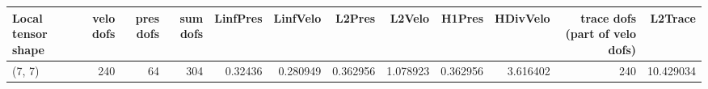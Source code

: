 \begin{tabular}{lrrrrrrrrrrr}
\toprule
Local tensor shape &  velo dofs &  pres dofs &  sum dofs &  LinfPres &  LinfVelo &   L2Pres &   L2Velo &   H1Pres &  HDivVelo &  trace dofs (part of velo dofs) &   L2Trace \\
\midrule
            (7, 7) &        240 &         64 &       304 &   0.32436 &  0.280949 & 0.362956 & 1.078923 & 0.362956 &  3.616402 &                             240 & 10.429034 \\
\bottomrule
\end{tabular}
